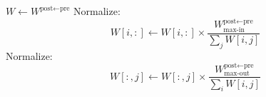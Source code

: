 \documentclass{article}
\begin{document}
\begin{algorithm}
\caption{Homeostasis}\label{alg:homeostasis}
\begin{algorithmic}[1]
\State $W \gets W^{\textrm{post}\leftarrow\textrm{pre}}$
            \State Normalize:
                \[
                W[i,:] \gets W[i,:] 
                \times
                \frac{W^{\textrm{post}\leftarrow\textrm{pre}}_\textrm{max-in}}{\sum_j W[i,j]}
                \]
        \EndIf
    \EndFor
            \State Normalize:
                \[
                W[:,j] \gets W[:,j] 
                \times
                \frac{W^{\textrm{post}\leftarrow\textrm{pre}}_\text{max-out}}{\sum_i W[i,j]}
                \]
        \EndIf
    \EndFor
\EndFunction
\end{algorithmic}
\end{algorithm}
\end{document}
